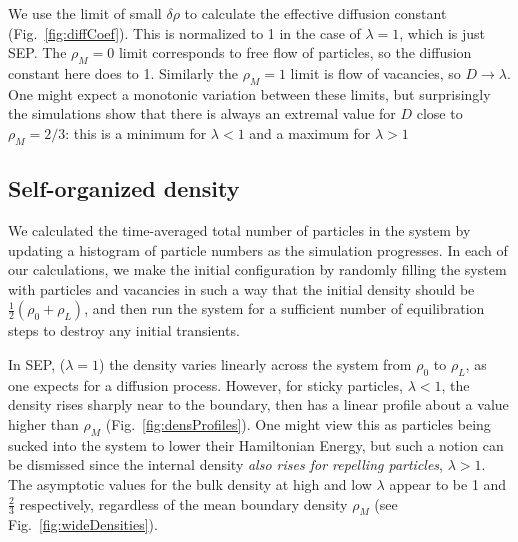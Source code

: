 \documentclass[
reprint, amsmath,amssymb,
]{revtex4-1}
\begin{document}
We use the limit of small $\delta\rho$ to calculate the effective
diffusion constant (Fig.~\ref{fig:diffCoef}).  This is normalized to 1 in the case of
$\lambda=1$, which is just SEP.  The $\rho_M=0$ limit corresponds to
free flow of particles, so the diffusion constant here does to
1. Similarly the $\rho_M=1$ limit is flow of vacancies, so
$D\rightarrow\lambda$.  One might expect a monotonic variation between
these limits, but surprisingly the simulations show that there is
always an extremal value for $D$ close to $\rho_M=2/3$: this is a
minimum for $\lambda<1$ and a maximum for $\lambda>1$


\subsection{Self-organized density}


We calculated the time-averaged total number of particles in
the system by updating a histogram of particle numbers
as the simulation progresses. In each of our calculations, we make the
initial configuration by randomly filling the system with particles
and vacancies in such a way that the initial density should be
$\frac{1}{2}(\rho_0 + \rho_L)$, and then run the system for a
sufficient number of equilibration steps to destroy any initial
transients.

In SEP, ($\lambda=1$) the density varies linearly across the system
from $\rho_0$ to $\rho_L$, as one expects for a diffusion process.
However, for sticky particles, $\lambda<1$, the density rises sharply
near to the boundary, then has a linear profile about a value higher
than $\rho_M$  (Fig.~\ref{fig:densProfiles}). 
One might view this as particles being sucked into the
system to lower their Hamiltonian Energy, but such a notion can be
dismissed since the internal density {\it also rises for repelling
  particles}, $\lambda>1$.  The asymptotic values for the bulk density at
high and low $\lambda$ appear to be 1 and $\frac{2}{3}$ respectively, regardless of the 
mean boundary density $\rho_M$ (see Fig.~\ref{fig:wideDensities}). 
\end{document}
